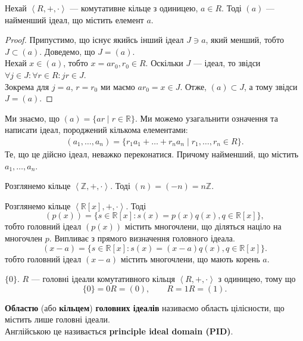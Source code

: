 \documentclass{math_library}
\begin{document}
\begin{proposition}
Нехай $\left<R,+,\cdot \right>$ --- комутативне кільце з одиницею, $a \in R$. Тоді $(a)$ --- найменший ідеал, що містить елемент $a$.
\end{proposition}

\begin{proof}
Припустимо, що існує якийсь інший ідеал $J \ni a$, який менший, тобто $J \subset (a)$. Доведемо, що $J = (a)$.\\
Нехай $x \in (a)$, тобто $x = ar_0, r_0 \in R$. Оскільки $J$ --- ідеал, то звідси $\forall j \in J: \forall r \in R: jr \in J$.\\
Зокрема для $j = a$, $r = r_0$ ми маємо $ar_0 = x \in J$. Отже, $(a) \subset J$, а тому звідси $J = (a)$.
\end{proof}

\begin{remark}
Ми знаємо, що $(a) = \{ ar \mid r \in \mathbb{R} \}$. Ми можемо узагальнити означення та написати ідеал, породжений кількома елементами:
\begin{align*}
(a_1,\dots,a_n) = \{r_1 a_1 + \dots + r_n a_n \mid r_1,\dots,r_n \in R\}.
\end{align*}
Те, що це дійсно ідеал, неважко переконатися. Причому найменший, що містить $a_1,\dots,a_n$.
\end{remark}

\begin{example}
Розглянемо кільце $\left< \mathbb{Z},+,\cdot \right>$. Тоді $(n) = (-n) = n \mathbb{Z}$.
\end{example}

\begin{example}
Розглянемо кільце $\left<\mathbb{R}[x],+,\cdot \right>$. Тоді
\[
(p(x)) = \{s \in \mathbb{R}[x]: s(x) = p(x)q(x), q \in \mathbb{R}[x] \},
\]
тобто головний ідеал $(p(x))$ містить многочлени, що діляться націло на многочлен $p$. Випливає з прямого визначення головного ідеала.
\[
(x-a) = \{s \in \mathbb{R}[x]: s(x) = (x-a)q(x), q \in \mathbb{R}[x]\}.
\]
тобто головний ідеал $(x-a)$ містить многочлени, що мають корень $a$.
\end{example}

\begin{remark}
$\{0\}$. $R$ --- головні ідеали комутативного кільця $\left<R,+,\cdot\right>$ з одиницею, тому що
\[
\{0\} = 0R = (0), \qquad R = 1R = (1).
\]
\end{remark}

\begin{definition}
\textbf{Областю} (або \textbf{кільцем}) \textbf{головних ідеалів} називаємо область цілісности, що містить лише головні ідеали.\\
Англійською це називається \textbf{principle ideal domain (PID)}.
\end{definition}
\end{document}
